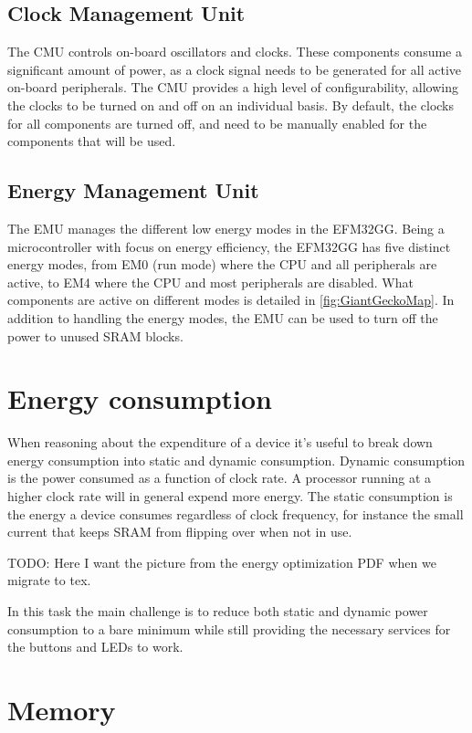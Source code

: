 \subsection{Clock Management Unit}
The CMU controls on-board oscillators and clocks. These components consume a significant amount of power, as a clock signal needs to be generated for all active on-board peripherals. The CMU provides a high level of configurability, allowing the clocks to be turned on and off on an individual basis. By default, the clocks for all components are turned off, and need to be manually enabled for the components that will be used.\cite{EFM32GG-RM}

\subsection{Energy Management Unit}
The EMU manages the different low energy modes in the EFM32GG. Being a microcontroller with focus on energy efficiency, the EFM32GG has five distinct energy modes, from EM0 (run mode) where the CPU and all peripherals are active, to EM4 where the CPU and most peripherals are disabled. What components are active on different modes is detailed in \ref{fig:GiantGeckoMap}. In addition to handling the energy modes, the EMU can be used to turn off the power to unused SRAM blocks.\cite{EFM32GG-RM}


\section{Energy consumption}

When reasoning about the expenditure of a device it’s useful to break down energy consumption into static and dynamic consumption. Dynamic consumption is the power consumed as a function of clock rate. A processor running at a higher clock rate will in general expend more energy. The static consumption is the energy a device consumes regardless of clock frequency, for instance the small current that keeps SRAM from flipping over when not in use.

TODO: Here I want the picture from the energy optimization PDF when we migrate to tex.

In this task the main challenge is to reduce both static and dynamic power consumption to a bare minimum while still providing the necessary services for the buttons and LEDs to work.



\section{Memory}

